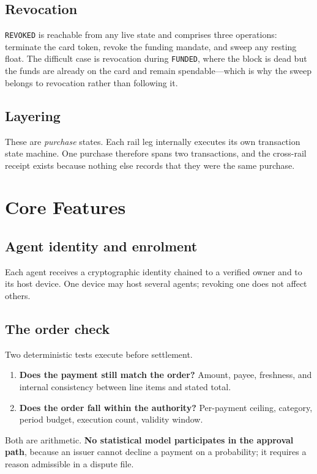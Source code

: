 \documentclass[journal,onecolumn,11pt]{IEEEtran}
\begin{document}
\subsection{Revocation}
\texttt{REVOKED} is reachable from any live state and comprises three operations:
terminate the card token, revoke the funding mandate, and sweep any resting float. The
difficult case is revocation during \texttt{FUNDED}, where the block is dead but the
funds are already on the card and remain spendable---which is why the sweep belongs to
revocation rather than following it.

\subsection{Layering}
These are \emph{purchase} states. Each rail leg internally executes its own transaction
state machine. One purchase therefore spans two transactions, and the cross-rail receipt
exists because nothing else records that they were the same purchase.

\section{Core Features}\label{sec:feat}

\subsection{Agent identity and enrolment}
Each agent receives a cryptographic identity chained to a verified owner and to its
host device. One device may host several agents; revoking one does not affect others.

\subsection{The order check}
Two deterministic tests execute before settlement.

\begin{enumerate}[leftmargin=*]
\item \textbf{Does the payment still match the order?} Amount, payee, freshness, and
internal consistency between line items and stated total.
\item \textbf{Does the order fall within the authority?} Per-payment ceiling, category,
period budget, execution count, validity window.
\end{enumerate}

Both are arithmetic. \textbf{No statistical model participates in the approval path},
because an issuer cannot decline a payment on a probability; it requires a reason
admissible in a dispute file.
\end{document}
